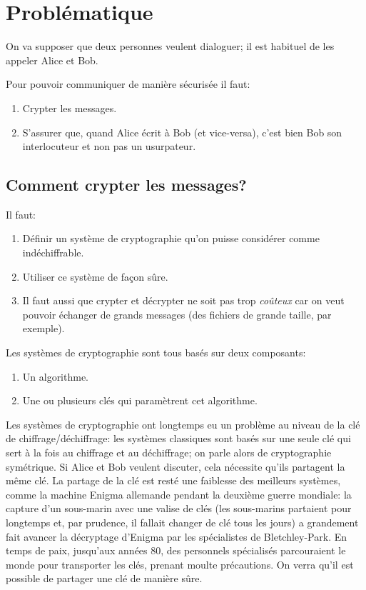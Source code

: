 \section{Problématique}
 On va supposer que deux
personnes veulent dialoguer; il est habituel de les appeler Alice et
Bob.

Pour pouvoir communiquer de manière sécurisée il faut:
\begin{enumerate}
  \item Crypter les messages.
  \item S'assurer que, quand Alice écrit à Bob (et vice-versa), c'est
    bien Bob son 
    interlocuteur et non pas un usurpateur.
\end{enumerate}

\subsection{Comment crypter les messages?}
Il faut:
\begin{enumerate}
\item Définir un système de cryptographie qu'on puisse considérer
  comme  indéchiffrable.
\item Utiliser ce système de façon sûre.
  
\item Il faut aussi que crypter et décrypter ne soit pas trop
  \emph{coûteux} car on veut pouvoir échanger de grands messages (des
  fichiers de grande taille, par exemple).
\end{enumerate}

Les systèmes de cryptographie sont tous basés sur deux
  composants:
  \begin{enumerate}
  \item Un algorithme.
  \item Une ou plusieurs \og clés\fg{} qui paramètrent cet algorithme.
  \end{enumerate}
  
Les systèmes de cryptographie ont longtemps eu un problème au niveau
de la clé de chiffrage/déchiffrage: 
les systèmes classiques sont basés sur une seule clé qui sert à la
fois au chiffrage et au déchiffrage; on parle alors de cryptographie
symétrique. Si Alice et Bob veulent 
discuter, cela    nécessite qu'ils  partagent la même
clé. La partage de la clé est resté une faiblesse des meilleurs systèmes, comme
la machine Enigma allemande pendant la deuxième guerre mondiale: la
capture d'un sous-marin avec une valise de clés (les sous-marins
partaient pour longtemps et, par prudence, il fallait changer de clé
tous les jours) 
a grandement fait avancer la décryptage d'Enigma par les spécialistes
de Bletchley-Park. En temps de paix, jusqu'aux années 80, des
personnels spécialisés parcouraient le monde pour transporter les
clés, prenant moulte précautions. On verra qu'il est possible de
partager une clé de manière sûre.

